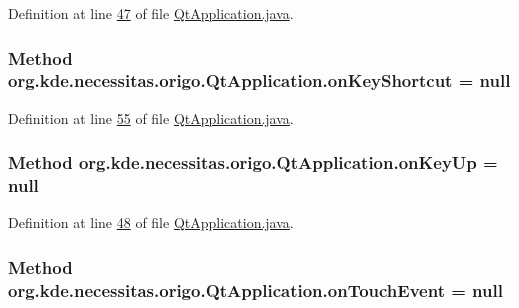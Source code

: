 Definition at line \hyperlink{_qt_application_8java_source_l00047}{47} of file \hyperlink{_qt_application_8java_source}{Qt\-Application.\-java}.

\hypertarget{classorg_1_1kde_1_1necessitas_1_1origo_1_1_qt_application_a98b2c8ed32427b53f59310a81ca43b48}{
\subsubsection[{on\-Key\-Shortcut}]{\setlength{\rightskip}{0pt plus 5cm}Method org.\-kde.\-necessitas.\-origo.\-Qt\-Application.\-on\-Key\-Shortcut = null\hspace{0.3cm}{\ttfamily [static]}}}\label{d0/da0/classorg_1_1kde_1_1necessitas_1_1origo_1_1_qt_application_a98b2c8ed32427b53f59310a81ca43b48}


Definition at line \hyperlink{_qt_application_8java_source_l00055}{55} of file \hyperlink{_qt_application_8java_source}{Qt\-Application.\-java}.

\hypertarget{classorg_1_1kde_1_1necessitas_1_1origo_1_1_qt_application_a14391cdd6db670ebc6476f3d77c98478}{
\subsubsection[{on\-Key\-Up}]{\setlength{\rightskip}{0pt plus 5cm}Method org.\-kde.\-necessitas.\-origo.\-Qt\-Application.\-on\-Key\-Up = null\hspace{0.3cm}{\ttfamily [static]}}}\label{d0/da0/classorg_1_1kde_1_1necessitas_1_1origo_1_1_qt_application_a14391cdd6db670ebc6476f3d77c98478}


Definition at line \hyperlink{_qt_application_8java_source_l00048}{48} of file \hyperlink{_qt_application_8java_source}{Qt\-Application.\-java}.

\hypertarget{classorg_1_1kde_1_1necessitas_1_1origo_1_1_qt_application_a6af32ee65449508fd3d725b9ea4509ec}{
\subsubsection[{on\-Touch\-Event}]{\setlength{\rightskip}{0pt plus 5cm}Method org.\-kde.\-necessitas.\-origo.\-Qt\-Application.\-on\-Touch\-Event = null\hspace{0.3cm}{\ttfamily [static]}}}\label{d0/da0/classorg_1_1kde_1_1necessitas_1_1origo_1_1_qt_application_a6af32ee65449508fd3d725b9ea4509ec}


